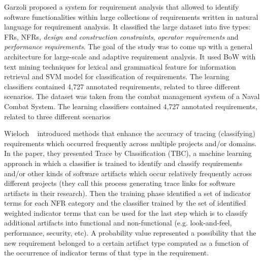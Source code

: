 	Garzoli \cite {Garzoli:2013} proposed a system for requirement analysis that allowed to identify software functionalities within large collections of requirements written in natural language for requirement analysis. It classified the large dataset into five types:
FRs, NFRs, \emph{design and construction constraints}, \emph{operator
requirements} and \emph{performance requirements}.  The goal of the study was to come up with a general
architecture for large-scale and adaptive requirement analysis. It used BoW with text mining techniques for lexical and grammatical feature for information retrieval and SVM model for classification of requirements. The learning classifiers contained 4,727 annotated requirements, related
to three different scenarios. The dataset was taken from
the combat management system of a Naval Combat System. The learning classifiers contained 4,727 annotated requirements, related
to three different scenarios

	Wieloch \etal~\cite{Wieloch:2013} introduced methods that enhance the accuracy
of tracing (classifying) requirements which occurred frequently across multiple
projects and/or domains. In the paper, they presented Trace by Classification
(TBC), a machine learning approach in which a classifier is trained to identify
and classify requirements and/or other kinds of software artifacts which occur
relatively frequently across different projects (they call this process
generating trace links for software artifacts in their research).  Then the training phase identified a set of indicator
terms for each NFR category and the classifier trained by the
set of identified weighted indicator terms that can be used for the last step which is to classify additional
artifacts into functional and non-functional (e.g.
look-and-feel, performance, security, etc). A probability value represented 
a possibility that the new requirement belonged to a certain artifact type
computed as a function of the occurrence of indicator terms of that type in the
requirement. \\
